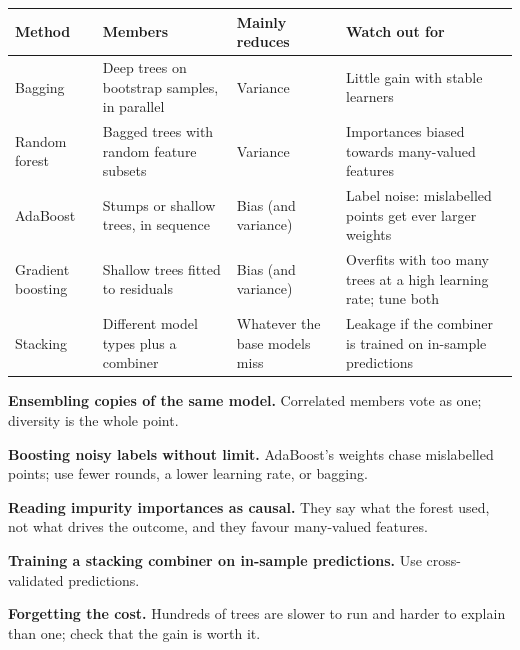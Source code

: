 \begin{longtable}{@{}L{2.8cm}L{3.8cm}L{3.8cm}L{4.4cm}@{}}
\toprule
{}
\textbf{Method} & \textbf{Members} & \textbf{Mainly reduces} & \textbf{Watch out for} \\
\midrule
\endhead
Bagging & Deep trees on bootstrap samples, in parallel & Variance & Little gain
with stable learners \\
Random forest & Bagged trees with random feature subsets & Variance & Importances
biased towards many-valued features \\
AdaBoost & Stumps or shallow trees, in sequence & Bias (and variance) & Label noise:
mislabelled points get ever larger weights \\
Gradient boosting & Shallow trees fitted to residuals & Bias (and variance) &
Overfits with too many trees at a high learning rate; tune both \\
Stacking & Different model types plus a combiner & Whatever the base models miss &
Leakage if the combiner is trained on in-sample predictions \\
\bottomrule
\end{longtable}

\begin{pitfall}
\begin{tight}
  \item \textbf{Ensembling copies of the same model.} Correlated members vote as
        one; diversity is the whole point.
  \item \textbf{Boosting noisy labels without limit.} AdaBoost's weights chase
        mislabelled points; use fewer rounds, a lower learning rate, or bagging.
  \item \textbf{Reading impurity importances as causal.} They say what the forest
        used, not what drives the outcome, and they favour many-valued features.
  \item \textbf{Training a stacking combiner on in-sample predictions.} Use
        cross-validated predictions.
  \item \textbf{Forgetting the cost.} Hundreds of trees are slower to run and harder
        to explain than one; check that the gain is worth it.
\end{tight}
\end{pitfall}

